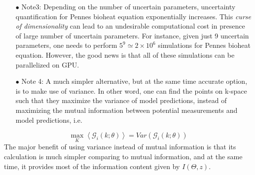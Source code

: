 \documentclass[10pt]{amsart}
\begin{document}
\begin{enumerate}
\begin{itemize}
\item[$\bullet$] Note3: Depending on the number of uncertain parameters, uncertainty quantification for Pennes bioheat equation exponentially increases. This \textit{curse of dimensionality} can lead to an undesirable computational cost in presence of large number of uncertain parameters. For instance, given just 9 uncertain parameters, one needs to perform $5^9\simeq2\times 10^6$ simulations for Pennes bioheat equation. However, the good news is that all of these simulations can be parallelized on GPU.

\item[$\bullet$] Note 4: A much simpler alternative, but at the same time accurate option, is to make use of variance. In other word, one can find the points on k-space such that they maximize the variance of model predictions, instead of maximizing the mutual information between potential measurements and model predictions, i.e.
\end{itemize}

\[
 \max_K \left< \mathcal{G}_i(k;\theta)  \right> = Var \left( \mathcal{G}_i(k;\theta)  \right)
\]
The major benefit of using variance instead of mutual information is that its calculation is much simpler comparing to mutual information, and at the same time, it provides most of the information content given by $I(\Theta,z)$.


\end{enumerate}
\end{document}
